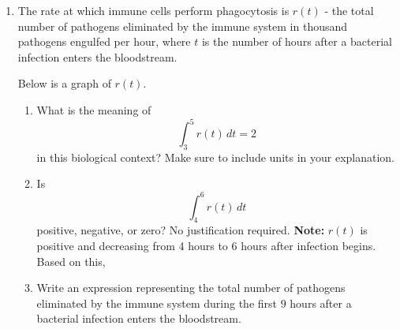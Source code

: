 \documentclass[11pt]{article}
\begin{document}
\begin{enumerate}


\newpage


\item The rate at which immune cells perform phagocytosis is $r(t)$ - the total number of pathogens eliminated by the immune system in thousand pathogens engulfed per hour, where $t$ is the number of hours after a bacterial infection enters the bloodstream.

Below is a graph of $r(t)$.

\begin{center}
\end{center}
\begin{enumerate}


\item What is the meaning of
\[
\int_{3}^{5} r(t)\,dt = 2
\]
in this biological context? Make sure to include units in your explanation.

\vfill
\vfill

\item Is
\[
\int_{4}^{6} r(t)\,dt
\]
positive, negative, or zero? No justification required. \textbf{Note:} $r(t)$ is positive and decreasing from 4 hours to 6 hours after infection begins. Based on this, 

\vfill


\item Write an expression representing the total number of pathogens eliminated by the immune system during the first $9$ hours after a bacterial infection enters the bloodstream.

\vfill
\vfill


\end{enumerate}
\end{enumerate}
\end{document}
